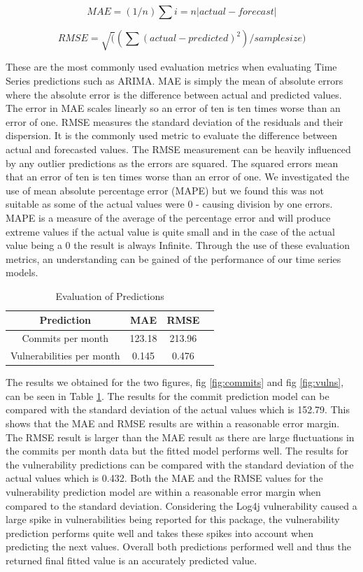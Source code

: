 \documentclass[conference]{IEEEtran}
\begin{document}
\[ MAE = (1/n) \sum{i=n} |actual - forecast| \]

\[ RMSE = \sqrt( (\sum (actual - predicted) ^ 2) / sample size )  \]

These are the most commonly used evaluation metrics when evaluating Time Series predictions such as ARIMA. MAE is simply the mean of absolute errors where the absolute error is the difference between actual and predicted values. The error in MAE scales linearly so an error of ten is ten times worse than an error of one. RMSE measures the standard deviation of the residuals and their dispersion. It is the commonly used metric to evaluate the difference between actual and forecasted values. The RMSE measurement can be heavily influenced by any outlier predictions \cite{f_abdulhafidh_dael_performance_2022} as the errors are squared. The squared errors mean that an error of ten is ten times worse than an error of one. We investigated the use of mean absolute percentage error (MAPE) but we found this was not suitable as some of the actual values were 0 - causing division by one errors. MAPE is a measure of the average of the percentage error and will produce extreme values if the actual value is quite small and in the case of the actual value being a 0 the result is always Infinite. Through the use of these evaluation metrics, an understanding can be gained of the performance of our time series models. 

\begin{table}
 \caption{Evaluation of Predictions}
\label{evaluations}
\begin{center}
\begin{tabular}{|c|c|c|c|}
\hline
    \textbf{Prediction} & \textbf{MAE} & \textbf{RMSE} \\ \hline
    Commits per month & 123.18 & 213.96 \\ \hline
    Vulnerabilities per month & 0.145 & 0.476 \\ \hline
\end{tabular}
\end{center}
\end{table}

The results we obtained for the two figures, fig \ref{fig:commits} and fig \ref{fig:vulns}, can be seen in Table \ref{evaluations}. The results for the commit prediction model can be compared with the standard deviation of the actual values which is 152.79. This shows that the MAE and RMSE results are within a reasonable error margin. The RMSE result is larger than the MAE result as there are large fluctuations in the commits per month data but the fitted model performs well. The results for the vulnerability predictions can be compared with the standard deviation of the actual values which is 0.432. Both the MAE and the RMSE values for the vulnerability prediction model are within a reasonable error margin when compared to the standard deviation. Considering the Log4j vulnerability caused a large spike in vulnerabilities being reported for this package, the vulnerability prediction performs quite well and takes these spikes into account when predicting the next values. Overall both predictions performed well and thus the returned final fitted value is an accurately predicted value.
\end{document}
